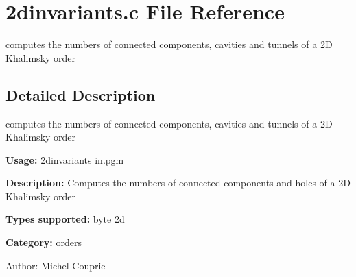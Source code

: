 \section{2dinvariants.c File Reference}
\label{2dinvariants_8c}
computes the numbers of connected components, cavities and tunnels of a 2D Khalimsky order 



\subsection{Detailed Description}
computes the numbers of connected components, cavities and tunnels of a 2D Khalimsky order 

{\bf Usage:} 2dinvariants in.pgm

{\bf Description:} Computes the numbers of connected components and holes of a 2D Khalimsky order

{\bf Types supported:} byte 2d

{\bf Category:} orders

\begin{Desc}
\item[Author:]Michel Couprie \end{Desc}
